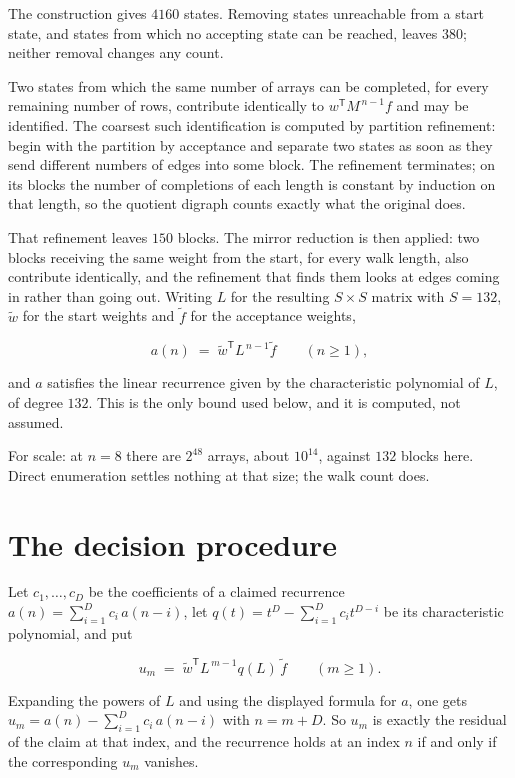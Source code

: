 \documentclass[11pt]{article}
\theoremstyle{definition}
\begin{document}
The construction gives $4160$ states. Removing states unreachable from a start state, and states from which no accepting state can be reached, leaves $380$; neither removal changes any count.

Two states from which the same number of arrays can be completed, for every remaining number of rows, contribute identically to $w^{\mathsf T}M^{\,n-1}f$ and may be identified. The coarsest such identification is computed by partition refinement: begin with the partition by acceptance and separate two states as soon as they send different numbers of edges into some block. The refinement terminates; on its blocks the number of completions of each length is constant by induction on that length, so the quotient digraph counts exactly what the original does.

That refinement leaves $150$ blocks. The mirror reduction is then applied: two blocks receiving the same weight from the start, for every walk length, also contribute identically, and the refinement that finds them looks at edges coming in rather than going out. Writing $L$ for the resulting $S \times S$ matrix with $S = 132$, $\tilde w$ for the start weights and $\tilde f$ for the acceptance weights,

\[a(n) \;=\; \tilde w^{\mathsf T} L^{\,n-1} \tilde f \qquad (n \ge 1),\]

and $a$ satisfies the linear recurrence given by the characteristic polynomial of $L$, of degree $132$. This is the only bound used below, and it is computed, not assumed.

For scale: at $n = 8$ there are $2^{48}$ arrays, about $10^{14}$, against $132$ blocks here. Direct enumeration settles nothing at that size; the walk count does.

\section{The decision procedure}

Let $c_1,\dots,c_D$ be the coefficients of a claimed recurrence $a(n) = \sum_{i=1}^{D} c_i\,a(n-i)$, let $q(t) = t^{D} - \sum_{i=1}^{D} c_i t^{D-i}$ be its characteristic polynomial, and put

\[u_m \;=\; \tilde w^{\mathsf T} L^{\,m-1} q(L)\,\tilde f \qquad (m \ge 1).\]

Expanding the powers of $L$ and using the displayed formula for $a$, one gets $u_m = a(n) - \sum_{i=1}^{D} c_i\,a(n-i)$ with $n = m + D$. So $u_m$ is exactly the residual of the claim at that index, and the recurrence holds at an index $n$ if and only if the corresponding $u_m$ vanishes.
\end{document}
